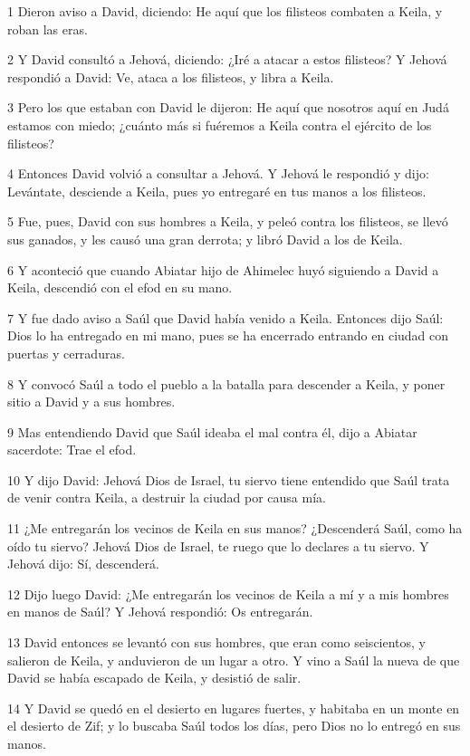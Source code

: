\par 1 Dieron aviso a David, diciendo: He aquí que los filisteos combaten a Keila, y roban las eras.
\par 2 Y David consultó a Jehová, diciendo: ¿Iré a atacar a estos filisteos? Y Jehová respondió a David: Ve, ataca a los filisteos, y libra a Keila.
\par 3 Pero los que estaban con David le dijeron: He aquí que nosotros aquí en Judá estamos con miedo; ¿cuánto más si fuéremos a Keila contra el ejército de los filisteos?
\par 4 Entonces David volvió a consultar a Jehová. Y Jehová le respondió y dijo: Levántate, desciende a Keila, pues yo entregaré en tus manos a los filisteos.
\par 5 Fue, pues, David con sus hombres a Keila, y peleó contra los filisteos, se llevó sus ganados, y les causó una gran derrota; y libró David a los de Keila.
\par 6 Y aconteció que cuando Abiatar hijo de Ahimelec huyó siguiendo a David a Keila, descendió con el efod en su mano.
\par 7 Y fue dado aviso a Saúl que David había venido a Keila. Entonces dijo Saúl: Dios lo ha entregado en mi mano, pues se ha encerrado entrando en ciudad con puertas y cerraduras.
\par 8 Y convocó Saúl a todo el pueblo a la batalla para descender a Keila, y poner sitio a David y a sus hombres.
\par 9 Mas entendiendo David que Saúl ideaba el mal contra él, dijo a Abiatar sacerdote: Trae el efod.
\par 10 Y dijo David: Jehová Dios de Israel, tu siervo tiene entendido que Saúl trata de venir contra Keila, a destruir la ciudad por causa mía.
\par 11 ¿Me entregarán los vecinos de Keila en sus manos? ¿Descenderá Saúl, como ha oído tu siervo? Jehová Dios de Israel, te ruego que lo declares a tu siervo. Y Jehová dijo: Sí, descenderá.
\par 12 Dijo luego David: ¿Me entregarán los vecinos de Keila a mí y a mis hombres en manos de Saúl? Y Jehová respondió: Os entregarán.
\par 13 David entonces se levantó con sus hombres, que eran como seiscientos, y salieron de Keila, y anduvieron de un lugar a otro. Y vino a Saúl la nueva de que David se había escapado de Keila, y desistió de salir.
\par 14 Y David se quedó en el desierto en lugares fuertes, y habitaba en un monte en el desierto de Zif; y lo buscaba Saúl todos los días, pero Dios no lo entregó en sus manos.
